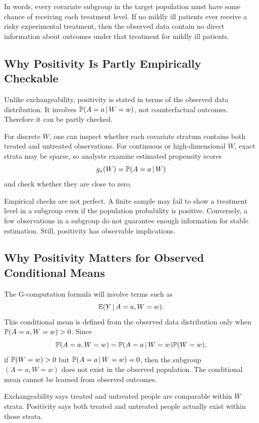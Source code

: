 In words, every covariate subgroup in the target population must have some chance of receiving each treatment level. If no mildly ill patients ever receive a risky experimental treatment, then the observed data contain no direct information about outcomes under that treatment for mildly ill patients.

\subsection{Why Positivity Is Partly Empirically Checkable}

Unlike exchangeability, positivity is stated in terms of the observed data distribution. It involves $\mathbb{P}(A=a\,\vert\, W=w)$, not counterfactual outcomes. Therefore it can be partly checked.

For discrete $W$, one can inspect whether each covariate stratum contains both treated and untreated observations. For continuous or high-dimensional $W$, exact strata may be sparse, so analysts examine estimated propensity scores
\[
g_a(W)=\mathbb{P}(A=a\,\vert\, W)
\]
and check whether they are close to zero.

Empirical checks are not perfect. A finite sample may fail to show a treatment level in a subgroup even if the population probability is positive. Conversely, a few observations in a subgroup do not guarantee enough information for stable estimation. Still, positivity has observable implications.

\subsection{Why Positivity Matters for Observed Conditional Means}

The G-computation formula will involve terms such as
\[
\mathbb{E}(Y\,\vert\, A=a,W=w).
\]
This conditional mean is defined from the observed data distribution only when $\mathbb{P}(A=a,W=w)>0$. Since
\[
\mathbb{P}(A=a,W=w)=\mathbb{P}(A=a\,\vert\, W=w)\mathbb{P}(W=w),
\]
if $\mathbb{P}(W=w)>0$ but $\mathbb{P}(A=a\,\vert\, W=w)=0$, then the subgroup $(A=a,W=w)$ does not exist in the observed population. The conditional mean cannot be learned from observed outcomes.

\begin{keyidea}
Exchangeability says treated and untreated people are comparable within $W$ strata. Positivity says both treated and untreated people actually exist within those strata.
\end{keyidea}
